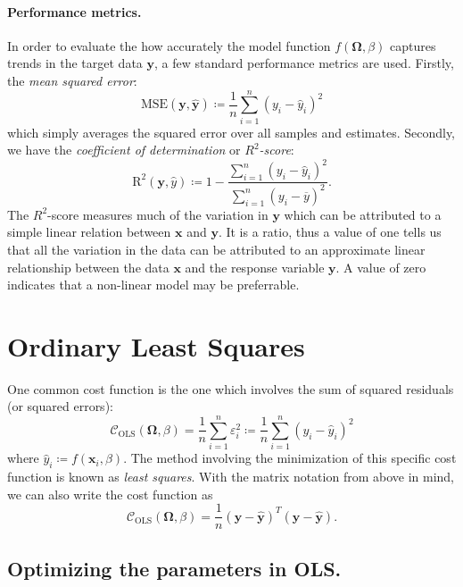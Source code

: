 \documentclass[dvipsnames, article, a4paper, oneside, 12pt]{memoir}
\newcommand{\x}{\bm{x}}
\newcommand{\MSE}[1]{\mathrm{MSE}(#1)}
\newcommand{\R}[1]{\mathrm{R}^2(#1)}
\newcommand{\OLS}{\mathrm{OLS}}
\newcommand{\y}{\bm{y}}
\newcommand{\data}{\bm{\Omega}}
\newcommand{\cost}{\mathcal{C}}
\begin{document}
  \paragraph{Performance metrics.}
  In order to evaluate the how accurately the model function \( f(\data, \beta)
  \) captures trends in the target data \( \y \), a few standard performance
  metrics are  used.  Firstly, the \emph{mean squared error}:
  \begin{equation}
    \MSE{\y, \hat{\y}} \coloneqq \frac{1}{n} \sum_{i=1}^n (y_i - \hat{y}_i)^2
  \end{equation}
  which simply averages the squared error over all samples and estimates.
  Secondly, we have the \emph{coefficient of determination} or
  \emph{\(R^2\)-score}:
  \begin{equation}
    \R{\y, \hat{y}} \coloneqq 1 - \frac{\sum_{i=1}^n (y_i -
    \hat{y}_i)^2}{\sum_{i=1}^n (y_i - \overline{y})^2}.
  \end{equation}
  The \(R^2\)-score measures much of the variation in \( \y \) which can be
  attributed to a simple linear relation between \( \x \) and \( \y \). It is a
  ratio, thus a value of one tells us that all the variation in the data can be
  attributed to an approximate linear relationship between the data \(\x\) and
  the response variable \( \y \). A value of zero indicates that a non-linear
  model may be preferrable.
  

  \section{Ordinary Least Squares}
  
  One common cost function is the one which involves the sum of squared
  residuals (or squared errors):
  \begin{equation}
    \label{eq:mse}
    \cost_\OLS(\data, \beta) = \frac{1}{n}\sum_{i = 1}^n \varepsilon_i^2 \coloneqq \frac{1}{n}\sum_{i=1}^n (y_i - \hat{y}_i)^2
  \end{equation}
  where \( \hat{y}_i \coloneqq f(\x_i, \beta) \). The method involving the
  minimization of this specific cost function is known as \emph{least squares}.
  With the matrix notation from above in mind, we can also write the cost
  function as
  \begin{equation}
    \cost_\OLS(\data, \beta) = \frac{1}{n} (\y - \hat{\y})^T (\y - \hat{\y}).
  \end{equation}

  

  \subsection{Optimizing the parameters in OLS.}
  
\end{document}
